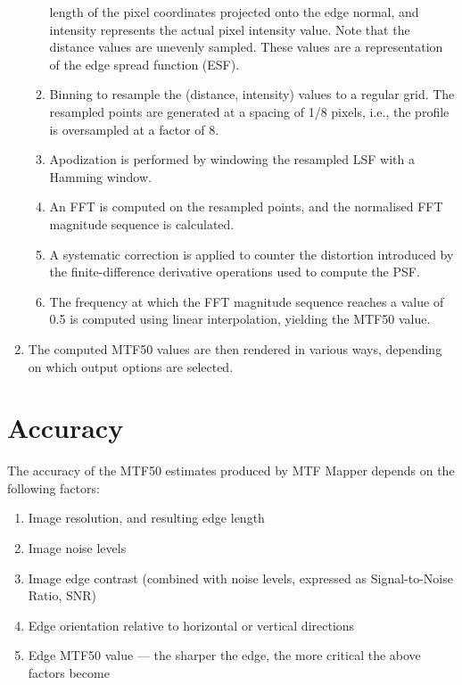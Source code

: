 \documentclass[a4paper]{article}
\begin{document}
\begin{enumerate}
\begin{enumerate}
length of the pixel coordinates projected onto the edge normal, and
\textsf{intensity} represents the actual pixel intensity value. Note that
the distance values are unevenly sampled. These values are a representation
of the edge spread function (ESF).
	  \item Binning to resample the  (\textsf{distance}, \textsf{intensity}) values to a regular grid. The
resampled points are generated at a spacing of 1/8 pixels, i.e., the
profile is oversampled at a factor of 8. 
	  \item Apodization is performed by windowing the resampled LSF with
a Hamming window.
	  \item An FFT is computed on the resampled points, and the
normalised FFT magnitude sequence is calculated.
          \item A systematic correction is applied to counter the distortion
introduced by the finite-difference derivative operations used to compute
the PSF.
	  \item The frequency at which the FFT magnitude sequence reaches a
value of 0.5 is computed using linear interpolation, yielding the MTF50
value.
	\end{enumerate}
    \item The computed MTF50 values are then rendered in various ways,
depending on which output options are selected.
\end{enumerate}

\section{Accuracy}
\label{sec:accuracy}
The accuracy of the MTF50 estimates produced by MTF Mapper depends on the
following factors:
\begin{enumerate}
  \item Image resolution, and resulting edge length
  \item Image noise levels
  \item Image edge contrast (combined with noise levels, expressed as
  Signal-to-Noise Ratio, SNR)
  \item Edge orientation relative to horizontal or vertical directions
  \item Edge MTF50 value --- the sharper the edge, the more critical the
  above factors become
\end{enumerate}
\end{document}
